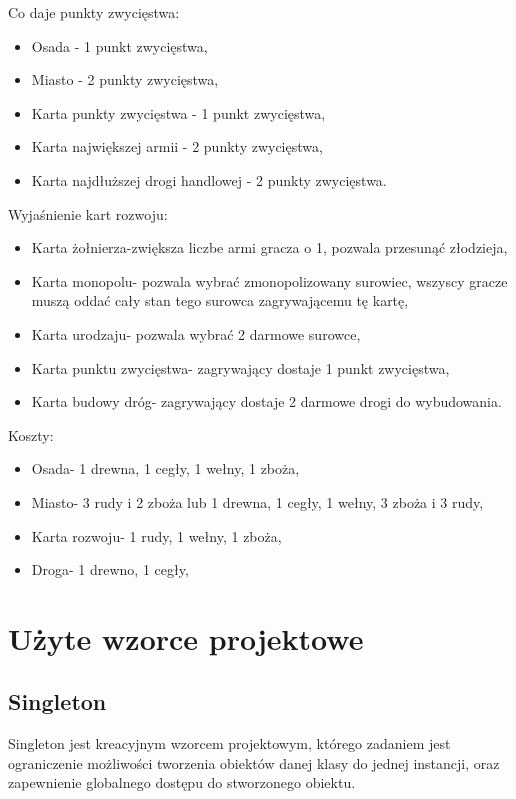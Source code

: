 \documentclass[a4paper, 11pt]{article}
\begin{document}
Co daje punkty zwycięstwa:
\begin{itemize}
\item Osada - 1 punkt zwycięstwa,
\item Miasto - 2 punkty zwycięstwa,
\item Karta punkty zwycięstwa - 1 punkt zwycięstwa,
\item Karta największej armii - 2 punkty zwycięstwa,
\item Karta najdłuższej drogi handlowej - 2 punkty zwycięstwa.
\end{itemize}

Wyjaśnienie kart rozwoju:
\begin{itemize}
\item Karta żołnierza-zwiększa liczbe armi gracza o 1, pozwala przesunąć złodzieja,
\item Karta monopolu- pozwala wybrać zmonopolizowany surowiec, wszyscy gracze muszą oddać cały stan tego surowca zagrywającemu tę kartę,
\item Karta urodzaju- pozwala wybrać 2 darmowe surowce,
\item Karta punktu zwycięstwa- zagrywający dostaje 1 punkt zwycięstwa,
\item Karta budowy dróg- zagrywający dostaje 2 darmowe drogi do wybudowania.
\end{itemize}
Koszty:
\begin{itemize}
\item Osada-  1 drewna, 1 cegły, 1 wełny, 1 zboża,
\item Miasto-  3 rudy i 2 zboża lub 1 drewna, 1 cegły, 1 wełny, 3 zboża i 3 rudy,
\item Karta rozwoju-  1 rudy, 1 wełny, 1 zboża,
\item Droga-  1 drewno, 1 cegły,
\end{itemize}


	
	
	
	
	
	\section{Użyte wzorce projektowe}
	\subsection{Singleton}
\indent

Singleton jest kreacyjnym wzorcem projektowym, którego zadaniem jest ograniczenie możliwości tworzenia obiektów danej klasy do jednej instancji, oraz zapewnienie globalnego dostępu do stworzonego obiektu.
\end{document}
